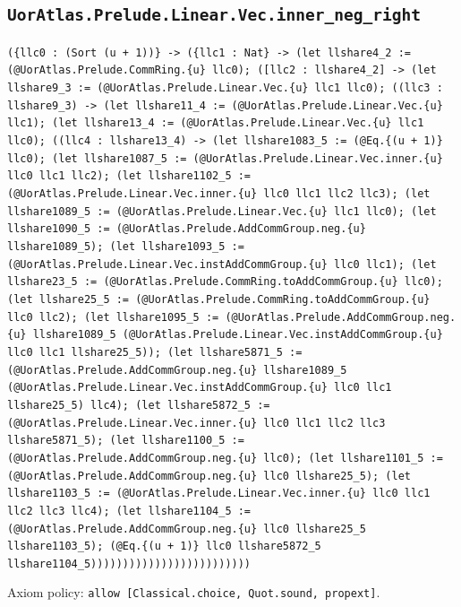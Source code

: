 \documentclass[11pt]{article}
\begin{document}
\subsection*{\texttt{UorAtlas.Prelude.Linear.Vec.inner\_neg\_right}}
\noindent\texttt{(\{llc0 : (Sort (u + 1))\} -> (\{llc1 : Nat\} -> (let llshare4\_2 := (@UorAtlas.Prelude.CommRing.\{u\} llc0); ([llc2 : llshare4\_2] -> (let llshare9\_3 := (@UorAtlas.Prelude.Linear.Vec.\{u\} llc1 llc0); ((llc3 : llshare9\_3) -> (let llshare11\_4 := (@UorAtlas.Prelude.Linear.Vec.\{u\} llc1); (let llshare13\_4 := (@UorAtlas.Prelude.Linear.Vec.\{u\} llc1 llc0); ((llc4 : llshare13\_4) -> (let llshare1083\_5 := (@Eq.\{(u + 1)\} llc0); (let llshare1087\_5 := (@UorAtlas.Prelude.Linear.Vec.inner.\{u\} llc0 llc1 llc2); (let llshare1102\_5 := (@UorAtlas.Prelude.Linear.Vec.inner.\{u\} llc0 llc1 llc2 llc3); (let llshare1089\_5 := (@UorAtlas.Prelude.Linear.Vec.\{u\} llc1 llc0); (let llshare1090\_5 := (@UorAtlas.Prelude.AddCommGroup.neg.\{u\} llshare1089\_5); (let llshare1093\_5 := (@UorAtlas.Prelude.Linear.Vec.instAddCommGroup.\{u\} llc0 llc1); (let llshare23\_5 := (@UorAtlas.Prelude.CommRing.toAddCommGroup.\{u\} llc0); (let llshare25\_5 := (@UorAtlas.Prelude.CommRing.toAddCommGroup.\{u\} llc0 llc2); (let llshare1095\_5 := (@UorAtlas.Prelude.AddCommGroup.neg.\{u\} llshare1089\_5 (@UorAtlas.Prelude.Linear.Vec.instAddCommGroup.\{u\} llc0 llc1 llshare25\_5)); (let llshare5871\_5 := (@UorAtlas.Prelude.AddCommGroup.neg.\{u\} llshare1089\_5 (@UorAtlas.Prelude.Linear.Vec.instAddCommGroup.\{u\} llc0 llc1 llshare25\_5) llc4); (let llshare5872\_5 := (@UorAtlas.Prelude.Linear.Vec.inner.\{u\} llc0 llc1 llc2 llc3 llshare5871\_5); (let llshare1100\_5 := (@UorAtlas.Prelude.AddCommGroup.neg.\{u\} llc0); (let llshare1101\_5 := (@UorAtlas.Prelude.AddCommGroup.neg.\{u\} llc0 llshare25\_5); (let llshare1103\_5 := (@UorAtlas.Prelude.Linear.Vec.inner.\{u\} llc0 llc1 llc2 llc3 llc4); (let llshare1104\_5 := (@UorAtlas.Prelude.AddCommGroup.neg.\{u\} llc0 llshare25\_5 llshare1103\_5); (@Eq.\{(u + 1)\} llc0 llshare5872\_5 llshare1104\_5)))))))))))))))))))))))))}\par
\noindent Axiom policy: \texttt{allow [Classical.choice, Quot.sound, propext]}.\par
\end{document}
